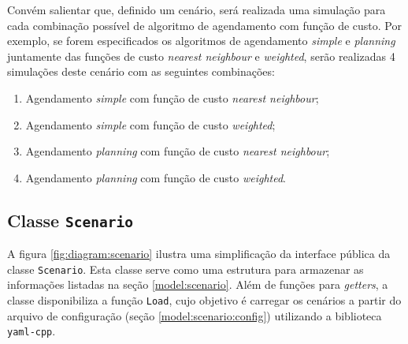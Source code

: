 Convém salientar que, definido um cenário, será realizada uma simulação para cada
combinação possível de algoritmo de agendamento com função de custo. Por
exemplo, se forem especificados os algoritmos de agendamento \textit{simple} e
\textit{planning} juntamente das funções de custo \textit{nearest neighbour} e
\textit{weighted}, serão realizadas 4 simulações deste cenário com as seguintes
combinações:

\begin{enumerate}
  \item Agendamento \textit{simple} com função de custo \textit{nearest neighbour};
  \item Agendamento \textit{simple} com função de custo \textit{weighted};
  \item Agendamento \textit{planning} com função de custo \textit{nearest neighbour};
  \item Agendamento \textit{planning} com função de custo \textit{weighted}.
\end{enumerate}

\subsection{\label{model:scenario:class}Classe \texttt{Scenario}}

A figura \ref{fig:diagram:scenario} ilustra uma simplificação da interface
pública da classe \texttt{Scenario}. Esta classe serve como uma estrutura para
armazenar as informações listadas na seção \ref{model:scenario}. Além de funções
para \textit{getters}, a classe disponibiliza a função \texttt{Load}, cujo
objetivo é carregar os cenários a partir do arquivo de configuração (seção
\ref{model:scenario:config}) utilizando a biblioteca \texttt{yaml-cpp}.

